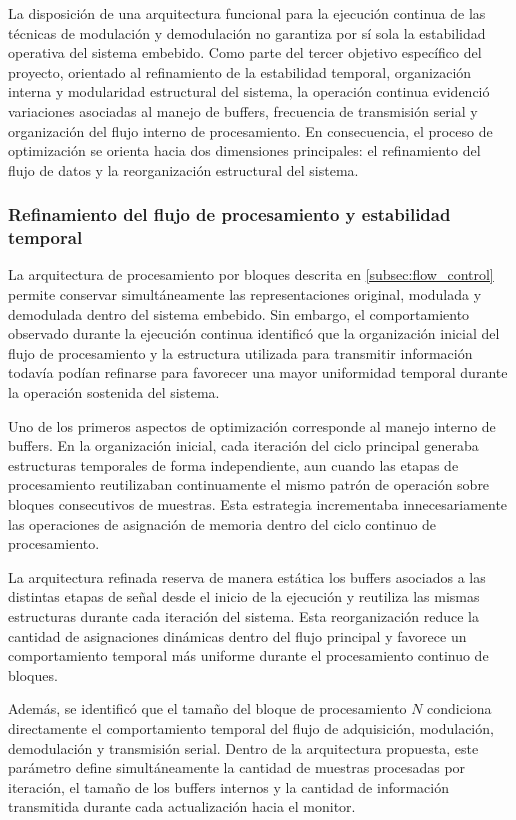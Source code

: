 La disposición de una arquitectura funcional para la ejecución continua de las técnicas de modulación y demodulación no garantiza por sí sola la estabilidad operativa del sistema embebido. Como parte del tercer objetivo específico del proyecto, orientado al refinamiento de la estabilidad temporal, organización interna y modularidad estructural del sistema, la operación continua evidenció variaciones asociadas al manejo de buffers, frecuencia de transmisión serial y organización del flujo interno de procesamiento. En consecuencia, el proceso de optimización se orienta hacia dos dimensiones principales: el refinamiento del flujo de datos y la reorganización estructural del sistema.
\label{subsec:refinamiento_flujo}
\subsubsection{Refinamiento del flujo de procesamiento y estabilidad temporal}

La arquitectura de procesamiento por bloques descrita en \ref{subsec:flow_control} permite conservar simultáneamente las representaciones original, modulada y demodulada dentro del sistema embebido. Sin embargo, el comportamiento observado durante la ejecución continua identificó que la organización inicial del flujo de procesamiento y la estructura utilizada para transmitir información todavía podían refinarse para favorecer una mayor uniformidad temporal durante la operación sostenida del sistema.

Uno de los primeros aspectos de optimización corresponde al manejo interno de buffers. En la organización inicial, cada iteración del ciclo principal generaba estructuras temporales de forma independiente, aun cuando las etapas de procesamiento reutilizaban continuamente el mismo patrón de operación sobre bloques consecutivos de muestras. Esta estrategia incrementaba innecesariamente las operaciones de asignación de memoria dentro del ciclo continuo de procesamiento.

La arquitectura refinada reserva de manera estática los buffers asociados a las distintas etapas de señal desde el inicio de la ejecución y reutiliza las mismas estructuras durante cada iteración del sistema. Esta reorganización reduce la cantidad de asignaciones dinámicas dentro del flujo principal y favorece un comportamiento temporal más uniforme durante el procesamiento continuo de bloques.

Además, se identificó que el tamaño del bloque de procesamiento $N$ condiciona directamente el comportamiento temporal del flujo de adquisición, modulación, demodulación y transmisión serial. Dentro de la arquitectura propuesta, este parámetro define simultáneamente la cantidad de muestras procesadas por iteración, el tamaño de los buffers internos y la cantidad de información transmitida durante cada actualización hacia el monitor.

